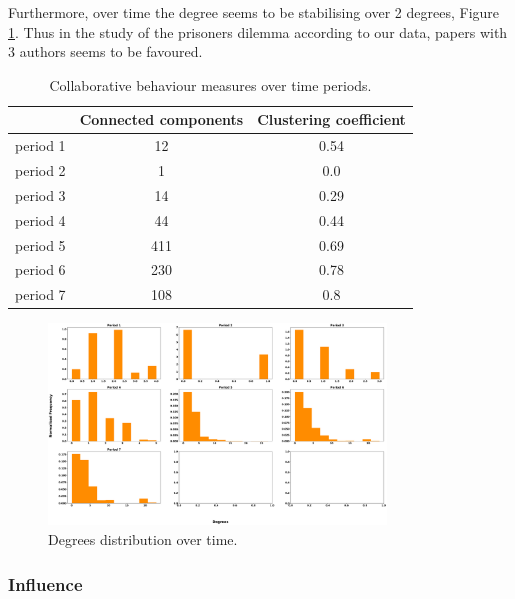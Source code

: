 \documentclass{article}
\begin{document}
Furthermore, over time the degree seems to be stabilising over 2 degrees, Figure
\ref{fig:dist_over_time}. Thus in the study of the prisoners dilemma according
to our data, papers with 3 authors seems to be favoured.

\begin{table}[!hbtp]
    \begin{center}
    \begin{tabular}{lcc}
        \toprule
                  & \textbf{Connected components} & \textbf{Clustering coefficient}\\
        \midrule
        period 1  & 12                            & 0.54 \\
        period 2  & 1                             & 0.0 \\
        period 3  & 14                            & 0.29 \\
        period 4  & 44                            & 0.44 \\
        period 5  & 411                           & 0.69 \\
        period 6  & 230                           & 0.78 \\
        period 7  & 108                           & 0.8 \\
        \bottomrule
    \end{tabular}
    \end{center}
    \caption{Collaborative behaviour measures over time periods.}
    \label{table:cc_over_time}
\end{table}

\begin{figure}[!hbtp]
    \centering
    \includegraphics[width=0.8\textwidth]{./assets/images/degrees_histrograms_temporal.pdf}
    \caption{Degrees distribution over time.}\label{fig:dist_over_time}
\end{figure}

\subsubsection{Influence}
\end{document}
